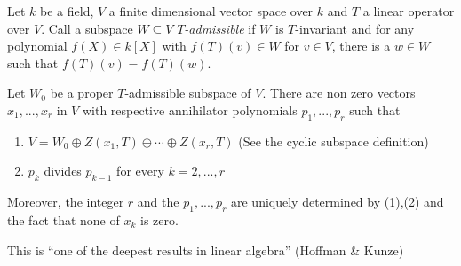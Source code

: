 \documentclass[12pt]{article}
\begin{document}
Let $k$ be a field, $V$ a finite dimensional vector space over $k$ and $T$ a linear operator over $V$.  Call a subspace $W\subseteq V$ \emph{$T$-admissible} if $W$ is $T$-invariant and for any polynomial $f(X)\in k[X]$ with $f(T)(v)\in W$ for $v\in V$, there is a $w\in W$ such that $f(T)(v)=f(T)(w)$.  

Let $W_0$ be a proper $T$-admissible subspace of $V$. There are non zero vectors $x_1,...,x_r$ in $V$ with respective annihilator polynomials $p_1,...,p_r$ such that
\begin{enumerate}
\item $V=W_0\oplus Z(x_1,T)\oplus \cdots \oplus Z(x_r,T)$ (See the cyclic subspace definition)
\item $p_k$ divides $p_{k-1}$ for every $k=2,...,r$
\end{enumerate}
Moreover, the integer $r$ and the  $p_1,...,p_r$ are uniquely determined by (1),(2) and the fact that none of $x_k$ is zero.

This is ``one of the deepest results in linear algebra'' (Hoffman \& Kunze)
\end{document}
